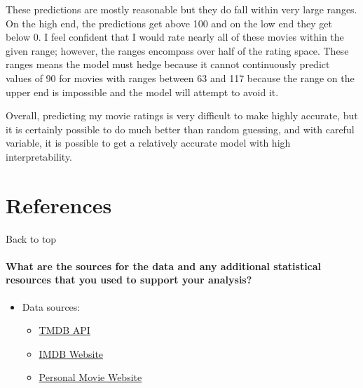 \documentclass[
]{article}
\providecommand{\tightlist}{%
  \setlength{\itemsep}{0pt}\setlength{\parskip}{0pt}}
\begin{document}
These predictions are mostly reasonable but they do fall within very
large ranges. On the high end, the predictions get above 100 and on the
low end they get below 0. I feel confident that I would rate nearly all
of these movies within the given range; however, the ranges encompass
over half of the rating space. These ranges means the model must hedge
because it cannot continuously predict values of 90 for movies with
ranges between 63 and 117 because the range on the upper end is
impossible and the model will attempt to avoid it.

Overall, predicting my movie ratings is very difficult to make highly
accurate, but it is certainly possible to do much better than random
guessing, and with careful variable, it is possible to get a relatively
accurate model with high interpretability.

\hypertarget{references}{%
\section{References}\label{references}}

Back to top

\hypertarget{what-are-the-sources-for-the-data-and-any-additional-statistical-resources-that-you-used-to-support-your-analysis}{%
\paragraph{What are the sources for the data and any additional
statistical resources that you used to support your
analysis?}\label{what-are-the-sources-for-the-data-and-any-additional-statistical-resources-that-you-used-to-support-your-analysis}}

\begin{itemize}
\tightlist
\item
  Data sources:

  \begin{itemize}
  \tightlist
  \item
    \href{https://www.themoviedb.org/documentation/api}{TMDB API}
  \item
    \href{https://www.imdb.com/}{IMDB Website}
  \item
    \href{https://www.tradethisandthat.com/movies/}{Personal Movie
    Website}
  \end{itemize}
\end{itemize}
\end{document}
